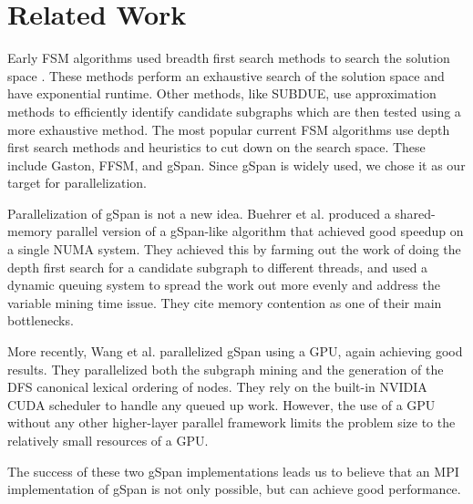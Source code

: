 \section{Related Work}
\label{sec:related}

Early FSM algorithms used breadth first search methods to search the
solution space \cite{AGM}\cite{FSG}.  These methods perform an exhaustive
search of the solution space and have exponential runtime.  Other methods, 
like SUBDUE\cite{subdue}, use approximation methods to efficiently 
identify candidate subgraphs which are then tested using a more exhaustive
method. The most popular current FSM algorithms use depth first search 
methods and heuristics to cut down on the search space. These include
Gaston\cite{gaston}, FFSM\cite{ffsm}, and gSpan\cite{gspan}.  Since
gSpan is widely used, we chose it as our target for parallelization.

Parallelization of gSpan is not a new idea. 
Buehrer et al. produced a shared-memory
parallel version of a gSpan-like algorithm that achieved good speedup on a 
single NUMA system\cite{buehrer2005parallel}.  They achieved this by 
farming out the work of doing the depth first search for a candidate 
subgraph to different threads, and used a dynamic queuing 
system to spread the work out more evenly and address the variable
mining time issue.  They cite memory contention as one of their main 
bottlenecks.

More recently, Wang et al. parallelized gSpan using a 
GPU\cite{gspancuda}, again achieving good results.  They parallelized both
the subgraph mining and the generation of the DFS canonical lexical 
ordering of nodes.  They rely on the built-in NVIDIA CUDA scheduler to handle
any queued up work. However, the use of a GPU without any other higher-layer 
parallel framework limits the problem size to the relatively small resources 
of a GPU. 

The success of these two gSpan implementations leads us to believe that an
MPI implementation of gSpan is not only possible, but can achieve good 
performance.

